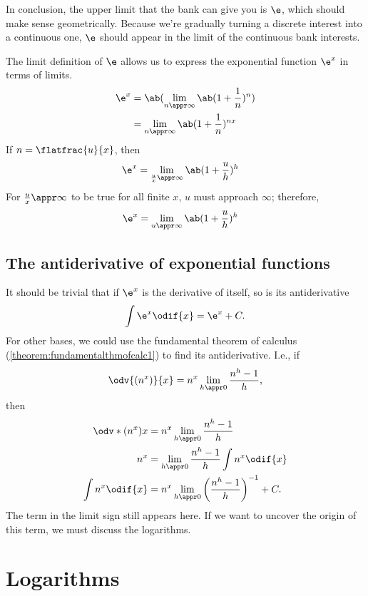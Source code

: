 In conclusion, the upper limit that the bank can give you is $\e$, which should make sense geometrically. Because we're gradually turning a discrete interest into a continuous one, $\e$ should appear in the limit of the continuous bank interests.

The limit definition of $\e$ allows us to express the exponential function $\e^x$ in terms of limits.
\begin{align}
	\e^x & = \ab(\lim_{n \appr \infty}\ab(1 + \frac{1}{n})^n) \\
	     & = \lim_{n \appr \infty}\ab(1 + \frac{1}{n})^{nx}
\end{align}
If $n = \flatfrac{u}{x}$, then
\begin{align}
	\e^x & = \lim_{\frac{u}{x} \appr \infty}\ab(1 + \frac{u}{h})^{h}
\end{align}
For $\frac{u}{x} \appr \infty$ to be true for all finite $x$, $u$ must approach $\infty$; therefore,
\begin{align}
	\e^x & = \lim_{u \appr \infty}\ab(1 + \frac{u}{h})^h
\end{align}

\subsection{The antiderivative of exponential functions}

It should be trivial that if $\e^x$ is the derivative of itself, so is its antiderivative
\begin{equation}
	\int \e^x \odif{x} = \e^x + C.
\end{equation}
For other bases, we could use the fundamental theorem of calculus (\cref{theorem:fundamentalthmofcalc1}) to find its antiderivative. I.e., if
\begin{equation*}
	\odv{(n^x)}{x} = n^x\lim_{h \appr 0}\frac{n^h - 1}{h},
\end{equation*}
then
\begin{align*}
	\odv*{(n^x)}{x}  & = n^x\lim_{h \appr 0}\frac{n^h - 1}{h}                         \\
	n^x              & = \lim_{h \appr 0}\frac{n^h - 1}{h}\int n^x\odif{x}            \\
	\int n^x\odif{x} & = n^x\lim_{h \appr 0}\left(\frac{n^h - 1}{h}\right)^{-1} + C.
\end{align*}
The term in the limit sign still appears here. If we want to uncover the origin of this term, we must discuss the logarithms.

\section{Logarithms}
\label{sec:logarithms}

